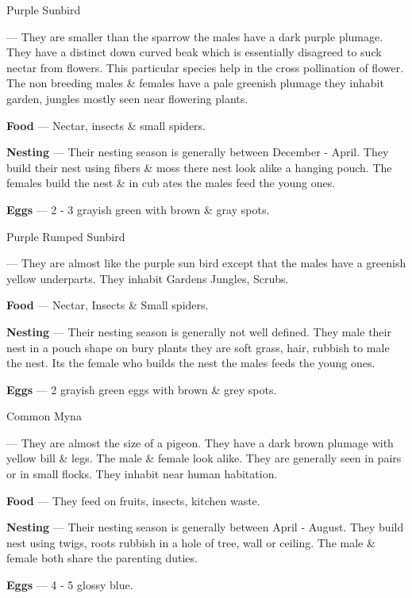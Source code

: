 \begin{bird}{Purple Sunbird}

 --- They are smaller than the sparrow the males have a dark purple plumage. They have a distinct down curved beak which is essentially disagreed  to suck nectar from flowers. This particular species help in the cross pollination of flower. The non breeding males \& females have a pale greenish plumage they inhabit garden, jungles mostly seen near flowering plants.

{\large\bf Food} --- Nectar, insects \& small spiders.

{\large\bf Nesting} --- Their nesting season is generally between December - April. They build their nest using fibers \& moss there nest look alike a hanging pouch. The females build the nest \& in cub ates the males feed the young ones.

{\large\bf Eggs} --- 2 - 3 grayish green with brown \& gray spots.
\end{bird}

\begin{bird}{Purple Rumped Sunbird}

 --- They are almost like the purple sun bird except that the males have a greenish yellow underparts. They inhabit Gardens Jungles, Scrubs.

{\large\bf Food} --- Nectar, Insects \& Small spiders.

{\large\bf Nesting} --- Their nesting season is generally not well defined. They male their nest in a pouch shape on bury plants they are soft grass, hair, rubbish to male the nest. Its the female who builds the nest the males feeds the young ones.

{\large\bf Eggs} --- 2 grayish green eggs with brown \& grey spots.
\end{bird}

\begin{bird}{Common Myna}

 --- They are almost the size of a pigeon. They have a dark brown plumage with yellow bill \& legs. The male \& female look alike. They are generally seen in pairs or in small flocks. They inhabit near human habitation.

{\large\bf Food} --- They feed on fruits, insects, kitchen waste. 

{\large\bf Nesting} --- Their nesting season is generally between April - August. They build nest using twigs, roots rubbish in a hole of tree, wall or ceiling. The male \& female both share the parenting duties.

{\large\bf Eggs} --- 4 - 5 glossy blue.
\end{bird}

